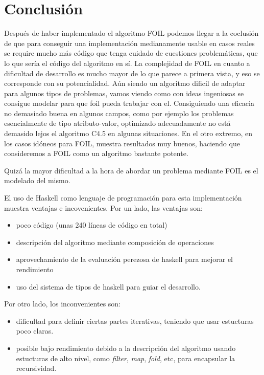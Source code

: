 \section{Conclusión}
Después de haber implementado el algoritmo FOIL podemos llegar a la coclusión de que para conseguir una implementación medianamente usable en casos reales se require mucho más código que tenga cuidado de cuestiones problemáticas, que lo que sería el código del algoritmo en sí.
La complejidad de FOIL en cuanto a dificultad de desarrollo es mucho mayor de lo que parece a primera vista, y eso se corresponde con su potencialidad.
Aún siendo un algoritmo dificil de adaptar para algunos tipos de problemas, vamos viendo como con ideas ingeniosas se consigue modelar para que foil pueda trabajar con el.
Consiguiendo una eficacia no demasiado buena en algunos campos, como por ejemplo los problemas esencialmente de tipo atributo-valor, optimizado adecuadamente no está demasido lejos el algoritmo C4.5 en algunas situaciones. En el otro extremo, en los casos idóneos para FOIL, muestra resultados muy buenos, haciendo que consideremos a FOIL como un algoritmo bastante potente.

Quizá la mayor dificultad a la hora de abordar un problema mediante FOIL es el modelado del mismo.

El uso de Haskell como lenguaje de programación para esta implementación muestra ventajas e incovenientes. Por un lado, las ventajas son:
\begin{itemize}
\item poco código (unas 240 líneas de código en total)
\item descripción del algoritmo mediante composición de operaciones
\item aprovechamiento de la evaluación perezosa de haskell para mejorar el rendimiento
\item uso del sistema de tipos de haskell para guiar el desarrollo.
\end{itemize}

Por otro lado, los inconvenientes son:
\begin{itemize}
\item dificultad para definir ciertas partes iterativas, teniendo que usar estucturas poco claras.
\item posible bajo rendimiento debido a la descripción del algoritmo usando estucturas de alto nivel, como \emph{filter}, \emph{map}, \emph{fold}, etc, para encapsular la recursividad.
\end{itemize}

